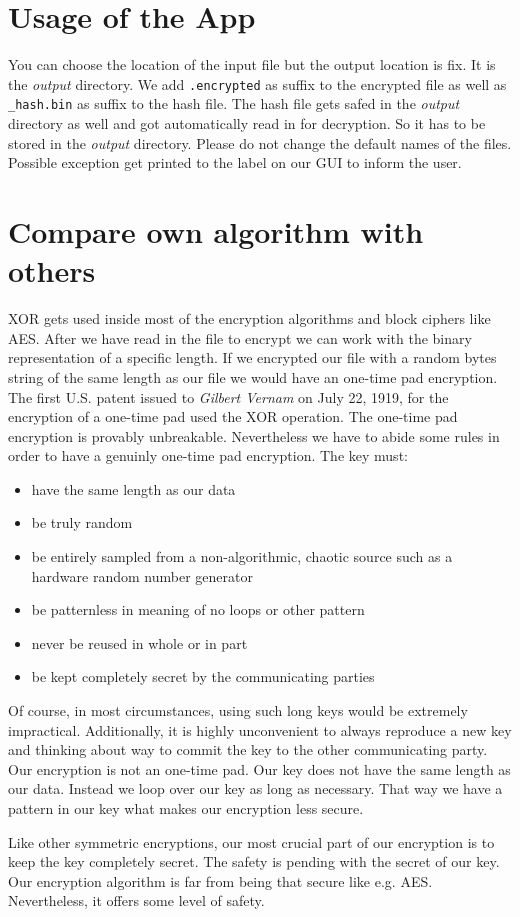 \documentclass[]{article}
\begin{document}
\section{Usage of the App}
You can choose the location of the input file but the output location is fix.
It is the \textit{output} directory. We add \texttt{.encrypted} as suffix to the encrypted file as well as
\texttt{\_hash.bin} as suffix to the hash file.
The hash file gets safed in the \textit{output} directory as well and got automatically read in 
for decryption. So it has to be stored in the \textit{output} directory. Please do not change 
the default names of the files. Possible exception get printed to the label on our GUI to inform
the user. 

\section{Compare own algorithm with others}
XOR gets used inside most of the encryption algorithms and block ciphers like AES. After we have read in the file to 
encrypt we can work with the binary representation of a specific length. If we encrypted our file with a random bytes 
string of the same length as our file we would have an one-time pad encryption. 
The first U.S. patent issued to \textit{Gilbert Vernam} on July 22, 1919, for the encryption of a one-time pad 
used the XOR operation. \cite{enwiki:1147326021} The one-time pad encryption is provably unbreakable. Nevertheless we 
have to abide some rules in order to have a genuinly one-time pad encryption. The key must: 
\begin{itemize}
    \item have the same length as our data
    \item be truly random
    \item be entirely sampled from a non-algorithmic, chaotic source such as a hardware random number generator
    \item be patternless in meaning of no loops or other pattern
    \item never be reused in whole or in part
    \item be kept completely secret by the communicating parties
\end{itemize}
Of course, in most circumstances, using such long keys would be extremely impractical. Additionally, it is highly
unconvenient to always reproduce a new key and thinking about way to commit the key to the other communicating party. 
Our encryption is not an one-time pad. Our key does not have the same length as our data. Instead we loop over our key as 
long as necessary. That way we have a pattern in our key what makes our encryption less secure.

Like other symmetric encryptions, our most crucial part of our encryption is to keep the key completely secret. The
safety is pending with the secret of our key. 
\noindent
Our encryption algorithm is far from being that secure like e.g. AES. Nevertheless, it offers some level of
safety. 

\newpage  
\printbibliography
\end{document}
